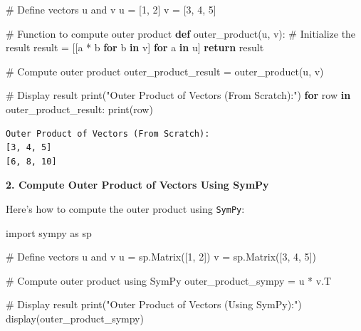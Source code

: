 \documentclass[
  letterpaper,
  DIV=11,
  numbers=noendperiod]{scrreprt}
\newenvironment{Shaded}{\begin{snugshade}}{\end{snugshade}}
\newcommand{\BuiltInTok}[1]{\textcolor[rgb]{0.00,0.23,0.31}{#1}}
\newcommand{\CommentTok}[1]{\textcolor[rgb]{0.37,0.37,0.37}{#1}}
\newcommand{\ControlFlowTok}[1]{\textcolor[rgb]{0.00,0.23,0.31}{\textbf{#1}}}
\newcommand{\DecValTok}[1]{\textcolor[rgb]{0.68,0.00,0.00}{#1}}
\newcommand{\ImportTok}[1]{\textcolor[rgb]{0.00,0.46,0.62}{#1}}
\newcommand{\KeywordTok}[1]{\textcolor[rgb]{0.00,0.23,0.31}{\textbf{#1}}}
\newcommand{\NormalTok}[1]{\textcolor[rgb]{0.00,0.23,0.31}{#1}}
\newcommand{\OperatorTok}[1]{\textcolor[rgb]{0.37,0.37,0.37}{#1}}
\newcommand{\StringTok}[1]{\textcolor[rgb]{0.13,0.47,0.30}{#1}}
\theoremstyle{plain}
\theoremstyle{definition}
\theoremstyle{remark}
\begin{document}
\begin{Shaded}
\begin{Highlighting}[]
\CommentTok{\# Define vectors u and v}
\NormalTok{u }\OperatorTok{=}\NormalTok{ [}\DecValTok{1}\NormalTok{, }\DecValTok{2}\NormalTok{]}
\NormalTok{v }\OperatorTok{=}\NormalTok{ [}\DecValTok{3}\NormalTok{, }\DecValTok{4}\NormalTok{, }\DecValTok{5}\NormalTok{]}

\CommentTok{\# Function to compute outer product}
\KeywordTok{def}\NormalTok{ outer\_product(u, v):}
    \CommentTok{\# Initialize the result}
\NormalTok{    result }\OperatorTok{=}\NormalTok{ [[a }\OperatorTok{*}\NormalTok{ b }\ControlFlowTok{for}\NormalTok{ b }\KeywordTok{in}\NormalTok{ v] }\ControlFlowTok{for}\NormalTok{ a }\KeywordTok{in}\NormalTok{ u]}
    \ControlFlowTok{return}\NormalTok{ result}

\CommentTok{\# Compute outer product}
\NormalTok{outer\_product\_result }\OperatorTok{=}\NormalTok{ outer\_product(u, v)}

\CommentTok{\# Display result}
\BuiltInTok{print}\NormalTok{(}\StringTok{"Outer Product of Vectors (From Scratch):"}\NormalTok{)}
\ControlFlowTok{for}\NormalTok{ row }\KeywordTok{in}\NormalTok{ outer\_product\_result:}
    \BuiltInTok{print}\NormalTok{(row)}
\end{Highlighting}
\end{Shaded}

\begin{verbatim}
Outer Product of Vectors (From Scratch):
[3, 4, 5]
[6, 8, 10]
\end{verbatim}

\textbf{2. Compute Outer Product of Vectors Using SymPy}

Here's how to compute the outer product using \texttt{SymPy}:

\begin{Shaded}
\begin{Highlighting}[]
\ImportTok{import}\NormalTok{ sympy }\ImportTok{as}\NormalTok{ sp}

\CommentTok{\# Define vectors u and v}
\NormalTok{u }\OperatorTok{=}\NormalTok{ sp.Matrix([}\DecValTok{1}\NormalTok{, }\DecValTok{2}\NormalTok{])}
\NormalTok{v }\OperatorTok{=}\NormalTok{ sp.Matrix([}\DecValTok{3}\NormalTok{, }\DecValTok{4}\NormalTok{, }\DecValTok{5}\NormalTok{])}

\CommentTok{\# Compute outer product using SymPy}
\NormalTok{outer\_product\_sympy }\OperatorTok{=}\NormalTok{ u }\OperatorTok{*}\NormalTok{ v.T}

\CommentTok{\# Display result}
\BuiltInTok{print}\NormalTok{(}\StringTok{"Outer Product of Vectors (Using SymPy):"}\NormalTok{)}
\NormalTok{display(outer\_product\_sympy)}
\end{Highlighting}
\end{Shaded}
\end{document}
